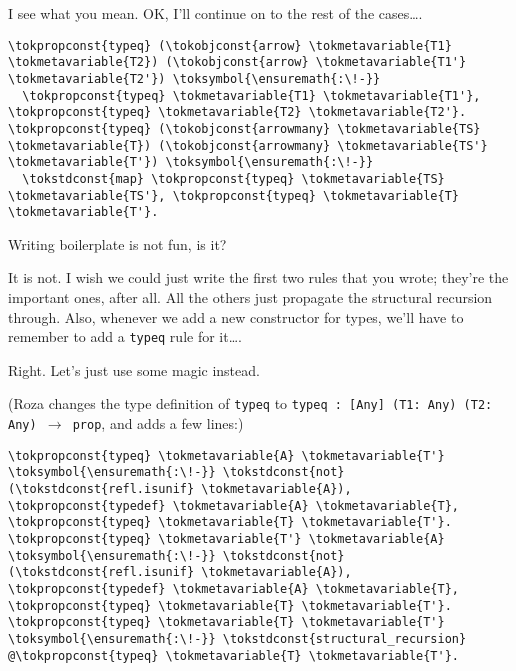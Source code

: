 \heroSTUDENT{} I see what you mean. OK, I'll continue on to the rest of the
cases\ldots{}.

\begin{verbatim}
\tokpropconst{typeq} (\tokobjconst{arrow} \tokmetavariable{T1} \tokmetavariable{T2}) (\tokobjconst{arrow} \tokmetavariable{T1'} \tokmetavariable{T2'}) \toksymbol{\ensuremath{:\!-}}
  \tokpropconst{typeq} \tokmetavariable{T1} \tokmetavariable{T1'}, \tokpropconst{typeq} \tokmetavariable{T2} \tokmetavariable{T2'}.
\tokpropconst{typeq} (\tokobjconst{arrowmany} \tokmetavariable{TS} \tokmetavariable{T}) (\tokobjconst{arrowmany} \tokmetavariable{TS'} \tokmetavariable{T'}) \toksymbol{\ensuremath{:\!-}}
  \tokstdconst{map} \tokpropconst{typeq} \tokmetavariable{TS} \tokmetavariable{TS'}, \tokpropconst{typeq} \tokmetavariable{T} \tokmetavariable{T'}.
\end{verbatim}

\heroADVISOR{} Writing boilerplate is not fun, is it?

\heroSTUDENT{} It is not. I wish we could just write the first two rules that
you wrote; they're the important ones, after all. All the others just
propagate the structural recursion through. Also, whenever we add a new
constructor for types, we'll have to remember to add a \texttt{typeq}
rule for it\ldots{}.

\heroADVISOR{} Right. Let's just use some magic instead.

\begin{scenecomment}
(Roza changes the type definition of \texttt{typeq} to \texttt{typeq : [Any] (T1: Any) (T2: Any) \ensuremath{\to} prop},
and adds a few lines:)
\end{scenecomment}

\importantCodeblock{}

\begin{verbatim}
\tokpropconst{typeq} \tokmetavariable{A} \tokmetavariable{T'} \toksymbol{\ensuremath{:\!-}} \tokstdconst{not}(\tokstdconst{refl.isunif} \tokmetavariable{A}), \tokpropconst{typedef} \tokmetavariable{A} \tokmetavariable{T}, \tokpropconst{typeq} \tokmetavariable{T} \tokmetavariable{T'}.
\tokpropconst{typeq} \tokmetavariable{T'} \tokmetavariable{A} \toksymbol{\ensuremath{:\!-}} \tokstdconst{not}(\tokstdconst{refl.isunif} \tokmetavariable{A}), \tokpropconst{typedef} \tokmetavariable{A} \tokmetavariable{T}, \tokpropconst{typeq} \tokmetavariable{T} \tokmetavariable{T'}.
\tokpropconst{typeq} \tokmetavariable{T} \tokmetavariable{T'} \toksymbol{\ensuremath{:\!-}} \tokstdconst{structural_recursion} @\tokpropconst{typeq} \tokmetavariable{T} \tokmetavariable{T'}.
\end{verbatim}

